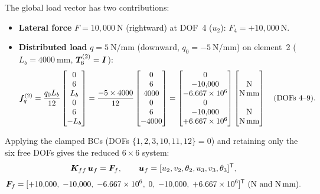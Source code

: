 \begin{example}
The global load vector has two contributions:
\begin{itemize}
    \item \textbf{Lateral force} $F=10{,}000\ \text{N}$ (rightward) at
          DOF~4 ($u_2$): $F_4 = +10{,}000\ \text{N}$.
    \item \textbf{Distributed load} $q = 5\ \text{N/mm}$ (downward,
          $q_0 = -5\ \text{N/mm}$) on element~2 ($L_b = 4000\ \text{mm}$,
          $\bm{T}_6^{(2)} = \bm{I}$):
          \[
            \bm{f}^{(2)}_q
            = \frac{q_0 L_b}{12}
              \begin{bmatrix}0\\6\\L_b\\0\\6\\{-L_b}\end{bmatrix}
            = \frac{-5 \times 4000}{12}
              \begin{bmatrix}0\\6\\4000\\0\\6\\{-4000}\end{bmatrix}
            =
              \begin{bmatrix}
                0\\ -10{,}000\\ -6.667\times10^6\\
                0\\ -10{,}000\\ +6.667\times10^6
              \end{bmatrix}
              \begin{bmatrix}\\\text{N}\\\text{N\,mm}\\\\\text{N}\\\text{N\,mm}\end{bmatrix}
              \quad\text{(DOFs 4--9)}.
          \]
\end{itemize}
Applying the clamped BCs (DOFs $\{1,2,3,10,11,12\} = 0$) and retaining only
the six free DOFs gives the reduced $6\times6$ system:
\[
    \bm{K}_{ff}\,\bm{u}_f = \bm{F}_f,
    \qquad
    \bm{u}_f = [u_2,v_2,\theta_2,u_3,v_3,\theta_3]^{\mathsf{T}},
\]
\[
    \bm{F}_f =
    [+10{,}000,\; -10{,}000,\; -6.667\times10^6,\;
     0,\; -10{,}000,\; +6.667\times10^6]^{\mathsf{T}}\ \text{(N and N\,mm)}.
\]


\end{example}
